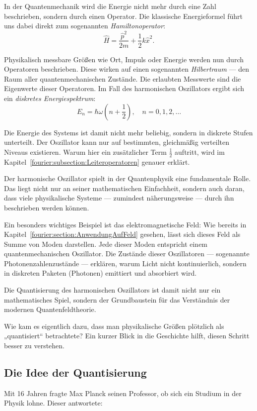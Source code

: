 In der Quantenmechanik wird die Energie nicht mehr durch eine Zahl beschrieben, sondern durch einen Operator.  
Die klassische Energieformel führt uns dabei direkt zum sogenannten \emph{Hamiltonoperator}:
\begin{equation}
\hat{H} = \frac{\hat{p}^2}{2m} + \frac{1}{2} k \hat{x}^2.
\label{fourier:equation:derQMHO}
\end{equation}

Physikalisch messbare Größen wie Ort, Impuls oder Energie werden nun durch Operatoren beschrieben.  
Diese wirken auf einen sogenannten \emph{Hilbertraum} — den Raum aller quantenmechanischen Zustände.  
Die erlaubten Messwerte sind die Eigenwerte dieser Operatoren.  
Im Fall des harmonischen Oszillators ergibt sich ein \emph{diskretes Energiespektrum}:
\[
E_n = \hbar \omega \left(n + \frac{1}{2} \right), \quad n = 0, 1, 2, \dots
\]

Die Energie des Systems ist damit nicht mehr beliebig, sondern in diskrete Stufen unterteilt.  
Der Oszillator kann nur auf bestimmten, gleichmäßig verteilten Niveaus existieren.
Warum hier ein zusätzlicher Term $\frac{1}{2}$ auftritt, wird im Kapitel~\ref{fourier:subsection:Leiteroperatoren} genauer erklärt.

Der harmonische Oszillator spielt in der Quantenphysik eine fundamentale Rolle.  
Das liegt nicht nur an seiner mathematischen Einfachheit, sondern auch daran, dass viele physikalische Systeme — zumindest näherungsweise — durch ihn beschrieben werden können.

Ein besonders wichtiges Beispiel ist das elektromagnetische Feld:  
Wie bereits in Kapitel~\ref{fourier:section:AnwendungAufFeld} gesehen, lässt sich dieses Feld als Summe von Moden darstellen.  
Jede dieser Moden entspricht einem quantenmechanischen Oszillator.  
Die Zustände dieser Oszillatoren — sogenannte Photonenzahlenzustände — erklären, warum Licht nicht kontinuierlich, sondern in diskreten Paketen (Photonen) emittiert und absorbiert wird.

\vspace{1em}

Die Quantisierung des harmonischen Oszillators ist damit nicht nur ein mathematisches Spiel, sondern der Grundbaustein für das Verständnis der modernen Quantenfeldtheorie.

Wie kam es eigentlich dazu, dass man physikalische Größen plötzlich als „quantisiert“ betrachtete?  
Ein kurzer Blick in die Geschichte hilft, diesen Schritt besser zu verstehen.

\subsection{Die Idee der Quantisierung\label{fourier:subsection:DieIdeeDerQuantisierung}}
	Mit 16 Jahren fragte Max Planck seinen Professor, ob sich ein Studium in der Physik lohne. 
	Dieser antwortete:
	
